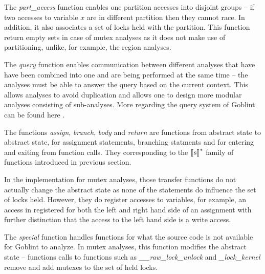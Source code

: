 \documentclass[..thesis.tex]{subfiles}
\begin{document}
The \textit{part\_access} function enables one partition accesses into disjoint groups -- if two accesses to variable $x$ are in different partition then they cannot race.
In addition, it also associates a set of locks held with the partition. This function return empty sets in case of mutex analyses as it does not make use of partitioning,
unlike, for example, the region analyses.

The \textit{query} function enables communication between different analyses that have have been combined into one and are being performed at the same time -- 
the analyses must be able to answer the query based on the current context. This allows analyses to avoid duplication and allows one to design more modular analyses consisting of sub-analyses. More regarding the query system of Goblint can be found here .

The functions \textit{assign}, \textit{branch}, \textit{body} and \textit{return} are functions from abstract state to abstract state, for assignment statements,
branching statments and for entering and exiting from function calls. They corresponding to the $\left\llbracket s \right\rrbracket^{*}$ family of functions introduced in previous section.


In the implementation for mutex analyses, those transfer functions do not actually change the abstract state as none of the statements do influence the set of locks held.
However, they do register accesses to variables, for example, an access in registered for both the left and right hand side of an assignment with further distinction
that the access to the left hand side is a write access.

The \textit{special} function handles functions for what the source code is not available for Goblint to analyze. In mutex analyses,
 this function modifies the abstract state -- functions calls to functions such as \textit{\_\_raw\_lock\_unlock} and \textit{\_lock\_kernel} 
remove and add mutexes to the set of held locks.


\end{document}
